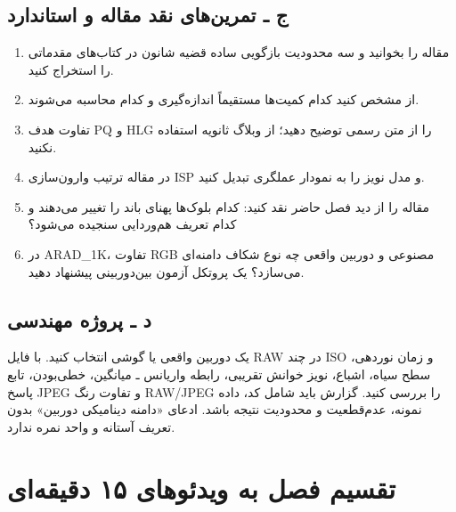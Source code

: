 \documentclass[12pt,openany,oneside]{book}
\begin{document}
\subsection*{ج ـ تمرین‌های نقد مقاله و استاندارد}
\begin{enumerate}
\item مقاله  را بخوانید و سه محدودیت بازگویی ساده قضیه شانون
در کتاب‌های مقدماتی را استخراج کنید.
\item از  مشخص کنید کدام کمیت‌ها مستقیماً اندازه‌گیری و کدام محاسبه می‌شوند.
\item تفاوت هدف PQ و HLG را از متن رسمی  توضیح دهید؛ از وبلاگ ثانویه استفاده نکنید.
\item در مقاله  ترتیب وارون‌سازی ISP و مدل نویز را به نمودار عملگری تبدیل کنید.
\item مقاله  را از دید فصل حاضر نقد کنید: کدام بلوک‌ها پهنای باند را تغییر می‌دهند و کدام
تعریف هم‌وردایی سنجیده می‌شود؟
\item در ARAD\_1K، تفاوت RGB مصنوعی و دوربین واقعی چه نوع شکاف دامنه‌ای می‌سازد؟ یک پروتکل آزمون
بین‌دوربینی پیشنهاد دهید.
\end{enumerate}

\subsection*{د ـ پروژه مهندسی}
یک دوربین واقعی یا گوشی انتخاب کنید. با فایل RAW در چند ISO و زمان نوردهی، سطح سیاه، اشباع، نویز
خوانش تقریبی، رابطه واریانس ـ میانگین، خطی‌بودن، تابع پاسخ JPEG و تفاوت رنگ RAW/JPEG را بررسی کنید.
گزارش باید شامل کد، داده نمونه، عدم‌قطعیت و محدودیت نتیجه باشد. ادعای «دامنه دینامیکی دوربین» بدون
تعریف آستانه و واحد نمره ندارد.

\section{تقسیم فصل به ویدئوهای ۱۵ دقیقه‌ای}
\end{document}
